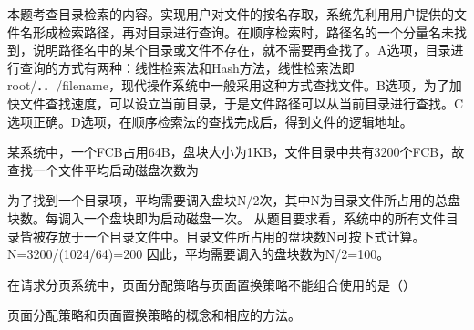 \begin{solution}本题考查目录检索的内容。实现用户对文件的按名存取，系统先利用用户提供的文件名形成检索路径，再对目录进行查询。在顺序检索时，路径名的一个分量名未找到，说明路径名中的某个目录或文件不存在，就不需要再查找了。A选项，目录进行查询的方式有两种：线性检索法和Hash方法，线性检索法即root/．．/filename，现代操作系统中一般采用这种方式查找文件。B选项，为了加快文件查找速度，可以设立当前目录，于是文件路径可以从当前目录进行查找。C选项正确。D选项，在顺序检索法的查找完成后，得到文件的逻辑地址。
\end{solution}
\question 某系统中，一个FCB占用64B，盘块大小为1KB，文件目录中共有3200个FCB，故查找一个文件平均启动磁盘次数为
\par{}
\begin{solution}为了找到一个目录项，平均需要调入盘块N/2次，其中N为目录文件所占用的总盘块数。每调入一个盘块即为启动磁盘一次。
从题目要求看，系统中的所有文件目录皆被存放于一个目录文件中。目录文件所占用的盘块数N可按下式计算。
N=3200/(1024/64)=200 因此，平均需要调入的盘块数为N/2=100。
\end{solution}
\question 在请求分页系统中，页面分配策略与页面置换策略不能组合使用的是（）
\par{}
\begin{solution}页面分配策略和页面置换策略的概念和相应的方法。
\end{solution}
